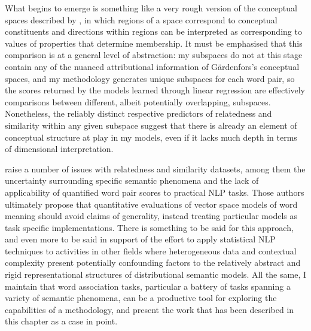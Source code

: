 What begins to emerge is something like a very rough version of the conceptual spaces described by \cite{Gardenfors2000}, in which regions of a space correspond to conceptual constituents and directions within regions can be interpreted as corresponding to values of properties that determine membership.  It must be emphasised that this comparison is at a general level of abstraction: my subspaces do not at this stage contain any of the nuanced attributional information of G\"{a}rdenfors's conceptual spaces, and my methodology generates unique subspaces for each word pair, so the scores returned by the models learned through linear regression are effectively comparisons between different, albeit potentially overlapping, subspaces.  Nonetheless, the reliably distinct respective predictors of relatedness and similarity within any given subspace suggest that there is already an element of conceptual structure at play in my models, even if it lacks much depth in terms of dimensional interpretation.

\cite{FaruquiEA2016} raise a number of issues with relatedness and similarity datasets, among them the uncertainty surrounding specific semantic phenomena and the lack of applicability of quantified word pair scores to practical NLP tasks.  Those authors ultimately propose that quantitative evaluations of vector space models of word meaning should avoid claims of generality, instead treating particular models as task specific implementations.  There is something to be said for this approach, and even more to be said in support of the effort to apply statistical NLP techniques to activities in other fields where heterogeneous data and contextual complexity present potentially confounding factors to the relatively abstract and rigid representational structures of distributional semantic models.  All the same, I maintain that word association tasks, particular a battery of tasks spanning a variety of semantic phenomena, can be a productive tool for exploring the capabilities of a methodology, and present the work that has been described in this chapter as a case in point.

